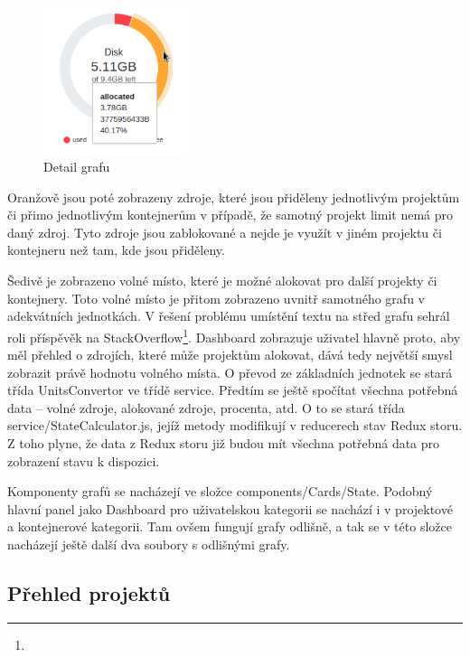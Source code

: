 \documentclass[a4paper,oneside,12pt]{report}
\begin{document}
\begin{figure}[h]
	\centering
	\includegraphics[height=4.3cm]{../img/tooltip.png}
	\caption[Detail grafu, vlastní tvorba]{Detail grafu}
	\label{fig:tootip}
\end{figure}

Oranžově jsou poté zobrazeny zdroje, které jsou přiděleny jednotlivým projektům či přimo jednotlivým kontejnerům v případě, že samotný projekt limit nemá pro daný zdroj.
Tyto zdroje jsou zablokované a nejde je využít v jiném projektu či kontejneru než tam, kde jsou přiděleny.

Šedivě je zobrazeno volné místo, které je možné alokovat pro další projekty či kontejnery.
Toto volné místo je přitom zobrazeno uvnitř samotného grafu v adekvátních jednotkách.
V řešení problému umístění textu na střed grafu sehrál roli příspěvěk na StackOverflow\footnote{}.
Dashboard zobrazuje uživatel hlavně proto, aby měl přehled o zdrojích, které může projektům alokovat, dává tedy největší smysl zobrazit právě hodnotu volného místa.
O převod ze základních jednotek se stará třída UnitsConvertor ve třídě service.
Předtím se ještě spočítat všechna potřebná data -- volné zdroje, alokované zdroje, procenta, atd.
O to se stará třída service/StateCalculator.js, jejíž metody modifikují v reducerech stav Redux storu.
Z toho plyne, že data z Redux storu již budou mít všechna potřebná data pro zobrazení stavu k dispozici.

Komponenty grafů se nacházejí ve složce components/Cards/State.
Podobný hlavní panel jako Dashboard pro uživatelskou kategorii se nachází i v projektové a kontejnerové kategorii.
Tam ovšem fungují grafy odlišně, a tak se v této složce nacházejí ještě další dva soubory s odlišnými grafy.

\subsection{Přehled projektů}
\end{document}
